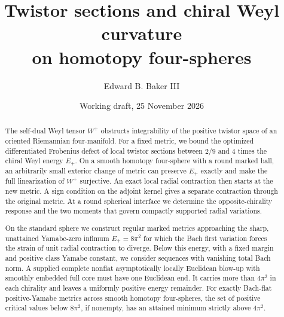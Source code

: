 \documentclass[11pt]{article}
\title{Twistor sections and chiral Weyl curvature\\on homotopy four-spheres}
\author{Edward B. Baker III}
\date{Working draft, 25 November 2026}
\numberwithin{equation}{section}
\theoremstyle{definition}
\theoremstyle{remark}
\begin{document}
\maketitle
\thispagestyle{plain}
\begin{abstract}
The self-dual Weyl tensor \(W^+\) obstructs integrability of the positive
twistor space of an oriented Riemannian four-manifold. For a fixed metric,
we bound the optimized differentiated Frobenius defect of local twistor
sections between \(2/9\) and \(4\) times the chiral Weyl energy \(E_+\).
On a smooth homotopy four-sphere with a round marked ball, an arbitrarily
small exterior change of metric can preserve \(E_+\) exactly and make the
full linearization of \(W^+\) surjective. An exact local radial contraction
then starts at the new metric. A sign condition on the adjoint kernel
gives a separate contraction through the original metric. At a round
spherical interface we determine the opposite-chirality response and
the two moments that govern compactly supported radial variations.

On the standard sphere we construct regular marked metrics approaching
the sharp, unattained Yamabe-zero infimum \(E_+=8\pi^2\) for which the
Bach first variation forces the strain of unit radial contraction to
diverge. Below this energy, with a fixed
margin and positive class Yamabe constant, we consider sequences with
vanishing total Bach norm. A supplied complete nonflat asymptotically
locally Euclidean blow-up with smoothly embedded full core must have
one Euclidean end. It carries more than \(4\pi^2\) in each chirality
and leaves a uniformly positive energy remainder. For exactly
Bach-flat positive-Yamabe metrics across smooth homotopy four-spheres,
the set of positive critical values below \(8\pi^2\), if nonempty, has
an attained minimum strictly above \(4\pi^2\).


\end{abstract}
\end{document}
